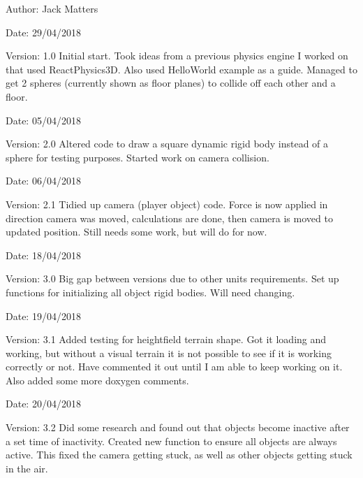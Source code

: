 \begin{Desc}
\item[Author:]Jack Matters\end{Desc}
\begin{Desc}
\item[Date:]29/04/2018 \end{Desc}
\begin{Desc}
\item[Version:]1.0 Initial start. Took ideas from a previous physics engine I worked on that used ReactPhysics3D. Also used HelloWorld example as a guide. Managed to get 2 spheres (currently shown as floor planes) to collide off each other and a floor.\end{Desc}
\begin{Desc}
\item[Date:]05/04/2018 \end{Desc}
\begin{Desc}
\item[Version:]2.0 Altered code to draw a square dynamic rigid body instead of a sphere for testing purposes. Started work on camera collision.\end{Desc}
\begin{Desc}
\item[Date:]06/04/2018 \end{Desc}
\begin{Desc}
\item[Version:]2.1 Tidied up camera (player object) code. Force is now applied in direction camera was moved, calculations are done, then camera is moved to updated position. Still needs some work, but will do for now.\end{Desc}
\begin{Desc}
\item[Date:]18/04/2018 \end{Desc}
\begin{Desc}
\item[Version:]3.0 Big gap between versions due to other units requirements. Set up functions for initializing all object rigid bodies. Will need changing.\end{Desc}
\begin{Desc}
\item[Date:]19/04/2018 \end{Desc}
\begin{Desc}
\item[Version:]3.1 Added testing for heightfield terrain shape. Got it loading and working, but without a visual terrain it is not possible to see if it is working correctly or not. Have commented it out until I am able to keep working on it. Also added some more doxygen comments.\end{Desc}
\begin{Desc}
\item[Date:]20/04/2018 \end{Desc}
\begin{Desc}
\item[Version:]3.2 Did some research and found out that objects become inactive after a set time of inactivity. Created new function to ensure all objects are always active. This fixed the camera getting stuck, as well as other objects getting stuck in the air. \end{Desc}


